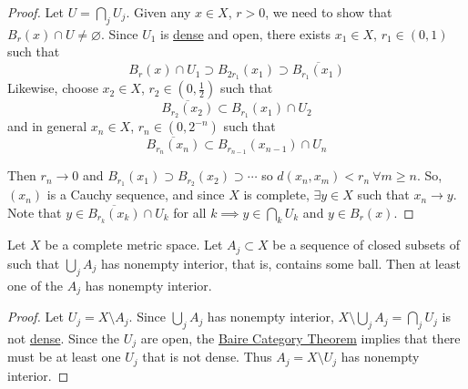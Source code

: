 \documentclass{article}
\renewcommand{\emptyset}{\varnothing}
\begin{document}
\begin{proof}
    Let $U = \bigcap_j U_j$. Given any $x \in X$, $r > 0$, we need to show that $B_r(x) \cap U \neq \emptyset$.
    Since $U_1$ is \hyperlink{def:dense}{dense} and open, there exists $x_1 \in X$, $r_1 \in (0, 1)$ such that
    \begin{equation*}
        B_r(x) \cap U_1 \supset B_{2r_1}(x_1) \supset \overline{B_{r_1}(x_1)}
    \end{equation*}
    Likewise, choose $x_2 \in X$, $r_2 \in (0, \frac{1}{2})$ such that
    \begin{equation*}
        \overline{B_{r_2}(x_2)} \subset B_{r_1}(x_1) \cap U_2
    \end{equation*}
    and in general $x_n \in X$, $r_n \in (0, 2^{-n})$ such that
    \begin{equation*}
        \overline{B_{r_n}(x_n)} \subset B_{r_{n-1}}(x_{n-1}) \cap U_n
    \end{equation*}

    Then $r_n \to 0$ and $B_{r_1}(x_1) \supset B_{r_2}(x_2) \supset \dotsb$ so $d(x_n, x_m) < r_n \ \forall m \geq n$.
    So, $(x_n)$ is a Cauchy sequence, and since $X$ is complete, $\exists y \in X$ such that $x_n \to y$.
    Note that $y \in \overline{B_{r_k}(x_k)} \cap U_k$ for all $k \implies y \in \bigcap_k U_k$ and $y \in B_r(x)$.
\end{proof}

\begin{cor}
    Let $X$ be a complete metric space.
    Let $A_j \subset X$ be a sequence of closed subsets of such that $\bigcup_j A_j$ has nonempty interior, that is, contains some ball.
    Then at least one of the $A_j$ has nonempty interior.
\end{cor}

\begin{proof}
    Let $U_j = X \setminus A_j$.
    Since $\bigcup_j A_j$ has nonempty interior, $X \setminus \bigcup_j A_j = \bigcap_j U_j$ is not \hyperlink{def:dense}{dense}.
    Since the $U_j$ are open, the \hyperlink{thm:baireCategory}{Baire Category Theorem} implies that there must be at least one $U_j$ that is not dense.
    Thus $A_j = X \setminus U_j$ has nonempty interior.
\end{proof}
\end{document}
